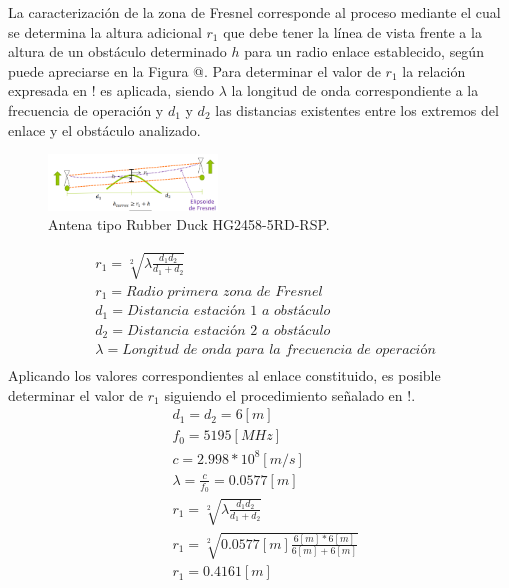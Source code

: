 \documentclass[conference]{IEEEtran}
\begin{document}
La caracterización de la zona de Fresnel corresponde al proceso mediante el cual se determina la altura adicional $r_1$ que debe tener la línea de vista
frente a la altura de un obstáculo determinado $h$ para un radio enlace establecido, según puede apreciarse en la Figura @. Para determinar el valor de $r_1$ la 
relación expresada en ! es aplicada, siendo $\lambda$ la longitud de onda correspondiente a la frecuencia de operación y $d_1$ y $d_2$ las distancias existentes
entre los extremos del enlace y el obstáculo analizado.
\begin{figure}
    \centering
          \includegraphics[width=0.4\textwidth]{Fresnel.png}
        \caption{Antena tipo Rubber Duck HG2458-5RD-RSP.
        }
        \label{fig:Fresnel}
\end{figure}
\begin{equation}
    \label{eq:Eq1}
    \begin{aligned}
        &r_{1} = \sqrt[2]{\lambda\frac{d_1d_2}{d_1+d_2}}\\
        &r_{1} = \textit{Radio primera zona de Fresnel}\\
        &d_{1} = \textit{Distancia estación 1 a obstáculo}\\
        &d_{2} = \textit{Distancia estación 2 a obstáculo}\\
        &\lambda = \textit{Longitud de onda para la frecuencia de operación}\\
    \end{aligned}
\end{equation}
Aplicando los valores correspondientes al enlace constituido, es posible determinar el valor de $r_1$ siguiendo el procedimiento
señalado en !.
\begin{equation}
    \label{eq:Eq2}
    \begin{aligned}
        &d_1=d_2=6[m]\\
        &f_0 = 5195[MHz]\\
        &c = 2.998*10^{8}[m/s]\\
        &\lambda = \frac{c}{f_0}=0.0577[m]\\
        &r_{1} = \sqrt[2]{\lambda\frac{d_1d_2}{d_1+d_2}}\\
        &r_{1} = \sqrt[2]{0.0577[m]\frac{6[m]*6[m]}{6[m]+6[m]}}\\
        &r_{1} = 0.4161[m]\\
    \end{aligned}
\end{equation}
\end{document}
